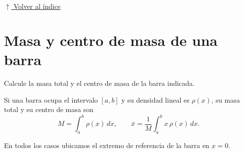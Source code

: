 \documentclass[12pt]{article}
\newcommand{\volverindice}{%
    \vspace{1em}%
    \begin{flushright}%
        \hyperlink{indice}{\small $\uparrow$ Volver al índice}%
    \end{flushright}%
}
\begin{document}
\volverindice
\newpage


\section{Masa y centro de masa de una barra}

Calcule la masa total y el centro de masa de la barra indicada.

Si una barra ocupa el intervalo $[a,b]$ y su densidad lineal es
$\rho(x)$, su masa total y su centro de masa son
\[
M=\int_{a}^{b}\rho(x)\,dx,
\qquad
\bar x=\frac{1}{M}\int_{a}^{b}x\,\rho(x)\,dx.
\]

En todos los casos ubicamos el extremo de referencia de la barra en
$x=0$.
\end{document}
